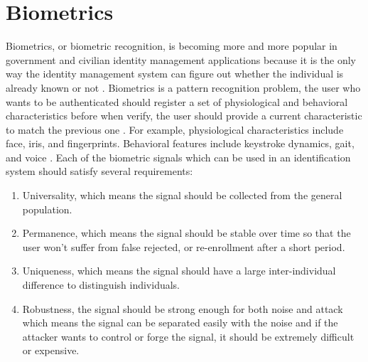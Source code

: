 \documentclass[a4paper,12pt]{article}
\begin{document}
\section{Biometrics}\label{Biometrics}
Biometrics, or biometric recognition, is becoming more and more popular in government and civilian identity management applications because it is the only way the identity management system can figure out whether the individual is already known or not \autocite{Jain:2011bio}. Biometrics is a pattern recognition problem, the user who wants to be authenticated should register a set of physiological and behavioral characteristics before when verify, the user should provide a current characteristic to match the previous one \autocite{Blasco:2018feasibility}. For example, physiological characteristics include face, iris, and fingerprints. Behavioral features include keystroke dynamics, gait, and voice \autocite{Agrafioti:2011heart}. Each of the biometric signals which can be used in an identification system should satisfy several requirements:
\begin{enumerate}
    \item Universality, which means the signal should be collected from the general population.
    \item Permanence, which means the signal should be stable over time so that the user won't suffer from false rejected, or re-enrollment after a short period.
    \item Uniqueness, which means the signal should have a large inter-individual difference to distinguish individuals.
    \item Robustness, the signal should be strong enough for both noise and attack which means the signal can be separated easily with the noise and if the attacker wants to control or forge the signal, it should be extremely difficult or expensive. 
\end{enumerate}
\end{document}
